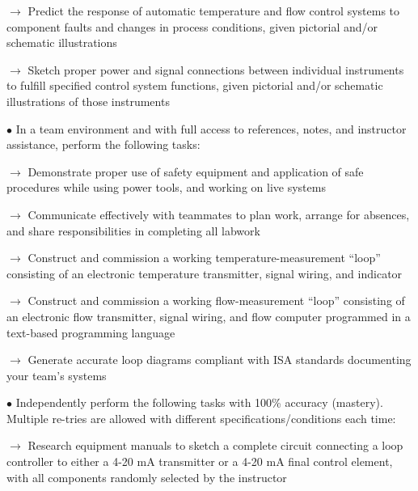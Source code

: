 \item\item{$\rightarrow$} Predict the response of automatic temperature and flow control systems to component faults and changes in process conditions, given pictorial and/or schematic illustrations 
\item\item{$\rightarrow$} Sketch proper power and signal connections between individual instruments to fulfill specified control system functions, given pictorial and/or schematic illustrations of those instruments 
\vskip 5pt
\item{$\bullet$} In a team environment and with full access to references, notes, and instructor assistance, perform the following tasks:
\item\item{$\rightarrow$} Demonstrate proper use of safety equipment and application of safe procedures while using power tools, and working on live systems
\item\item{$\rightarrow$} Communicate effectively with teammates to plan work, arrange for absences, and share responsibilities in completing all labwork
\item\item{$\rightarrow$} Construct and commission a working temperature-measurement ``loop'' consisting of an electronic temperature transmitter, signal wiring, and indicator
\item\item{$\rightarrow$} Construct and commission a working flow-measurement ``loop'' consisting of an electronic flow transmitter, signal wiring, and flow computer programmed in a text-based programming language
\item\item{$\rightarrow$} Generate accurate loop diagrams compliant with ISA standards documenting your team's systems
\vskip 5pt
\item{$\bullet$} Independently perform the following tasks with 100\% accuracy (mastery).  Multiple re-tries are allowed with different specifications/conditions each time:
\item\item{$\rightarrow$} Research equipment manuals to sketch a complete circuit connecting a loop controller to either a 4-20 mA transmitter or a 4-20 mA final control element, with all components randomly selected by the instructor
